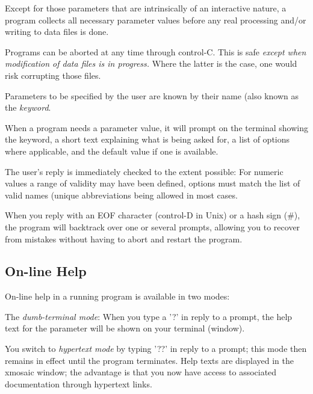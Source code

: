 \item   Except for those parameters that are intrinsically of an interactive
nature, a program collects all necessary parameter values before any real
processing and/or writing to data files is done.

\item   Programs can be aborted at any time through control-C. This is safe
{\em except when modification of data files is in progress.} Where the latter
is the case, one would risk corrupting those files.

\item   Parameters to be specified by the user are known by their name (also
known as the {\em keyword}.

\item   When a program needs a parameter value, it will prompt on the terminal
showing the keyword, a short text explaining what is being asked for, a list of
options where applicable, and the default value if one is available.

\item   The user's reply is immediately checked to the extent possible: For
numeric values a range of validity may have been defined, options must match
the list of valid names (unique abbreviations being allowed in most cases.

\item   When you reply with an EOF character (control-D in Unix) or a hash sign
(\#), the program will backtrack over one or several prompts, allowing you to
recover from mistakes without having to abort and restart the program.
\ei


\subsection{ On-line Help }
\label{.help}

	On-line help in a running program is available in two modes:
\bi
\item   The {\em dumb-terminal mode}: When you type a '?' in reply to a prompt,
the help text for the parameter will be shown on your terminal (window).

\item   You switch to {\em hypertext mode} by typing '??' in reply to a prompt;
this mode then remains in effect until the program terminates. Help texts are
displayed in the xmosaic window; the advantage is that you now have access to
associated documentation through hypertext links.
\ei



